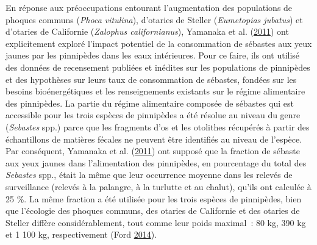 \documentclass[french,11pt]{book}
\begin{document}
\clearpage

\label{app:pinniped-predation}

En réponse aux préoccupations entourant l'augmentation des populations de phoques communs (\emph{Phoca vitulina}), d'otaries de Steller (\emph{Eumetopias jubatus}) et d'otaries de Californie (\emph{Zalophus californianus}), Yamanaka et al. (\protect\hyperlink{ref-yamanaka2011}{2011}) ont explicitement exploré l'impact potentiel de la consommation de sébastes aux yeux jaunes par les pinnipèdes dans les eaux intérieures. Pour ce faire, ils ont utilisé des données de recensement publiées et inédites sur les populations de pinnipèdes et des hypothèses sur leurs taux de consommation de sébastes, fondées sur les besoins bioénergétiques et les renseignements existants sur le régime alimentaire des pinnipèdes. La partie du régime alimentaire composée de sébastes qui est accessible pour les trois espèces de pinnipèdes a été résolue au niveau du genre (\emph{Sebastes} spp.) parce que les fragments d'os et les otolithes récupérés à partir des échantillons de matières fécales ne peuvent être identifiés au niveau de l'espèce. Par conséquent, Yamanaka et al. (\protect\hyperlink{ref-yamanaka2011}{2011}) ont supposé que la fraction de sébaste aux yeux jaunes dans l'alimentation des pinnipèdes, en pourcentage du total des \emph{Sebastes} spp., était la même que leur occurrence moyenne dans les relevés de surveillance (relevés à la palangre, à la turlutte et au chalut), qu'ils ont calculée à 25 \%. La même fraction a été utilisée pour les trois espèces de pinnipèdes, bien que l'écologie des phoques communs, des otaries de Californie et des otaries de Steller diffère considérablement, tout comme leur poids maximal~: 80 kg, 390 kg et 1 100 kg, respectivement (Ford \protect\hyperlink{ref-ford2014}{2014}).
\end{document}
